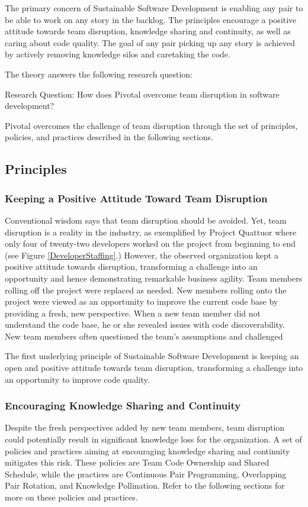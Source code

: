 The primary concern of Sustainable Software Development is enabling any pair to be able to work on any story in the backlog. The principles encourage a positive attitude towards team disruption, knowledge sharing and continuity, as well as caring about code quality. The goal of any pair picking up any story is achieved by actively removing knowledge silos and caretaking the code. 

The theory answers the following research question:

Research Question: How does Pivotal overcome team disruption in software development?

Pivotal overcomes the challenge of team disruption through the set of principles, policies, and practices described in the following sections.
\subsection{Principles}

\subsubsection{Keeping a Positive Attitude Toward Team Disruption}
Conventional wisdom says that team disruption should be avoided. Yet, team disruption is a reality in the industry, as exemplified by Project Quattuor where only four of twenty-two developers worked on the project from beginning to end (see Figure \ref{DeveloperStaffing}.) However, the observed organization kept a positive attitude towards disruption, transforming a challenge into an opportunity and hence demonstrating remarkable business agility. Team members rolling off the project were replaced as needed. New members rolling onto the project were viewed as an opportunity to improve the current code base by providing a fresh, new perspective. When a new team member did not understand the code base, he or she revealed issues with code discoverability. New team members often questioned the team's assumptions and challenged  

The first underlying principle of Sustainable Software Development is keeping an open and positive attitude towards team disruption, transforming a challenge into an opportunity to improve code quality.

\subsubsection{Encouraging Knowledge Sharing and Continuity}
Despite the fresh perspectives added by new team members, team disruption could potentially result in significant knowledge loss for the organization. A set of policies and practices aiming at encouraging knowledge sharing and continuity mitigates this risk. These policies are Team Code Ownership and Shared Schedule, while the practices are Continuous Pair Programming, Overlapping Pair Rotation, and Knowledge Pollination. Refer to the following sections for more on these policies and practices. 

